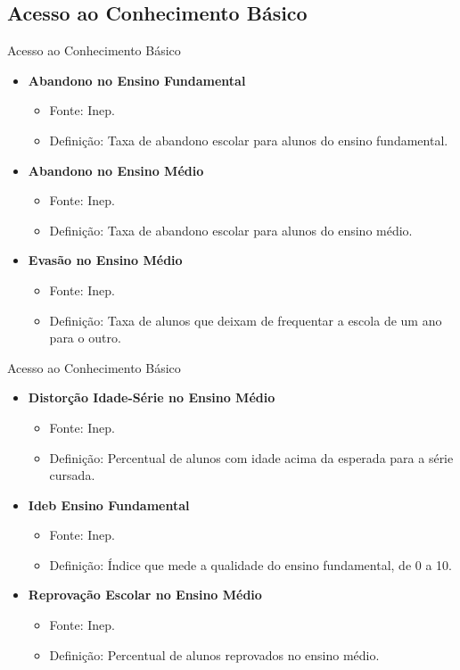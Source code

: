 \documentclass{beamer}
\begin{document}
\subsection{Acesso ao Conhecimento Básico}
\begin{frame}{Acesso ao Conhecimento Básico}
\begin{itemize}
    \item \textbf{Abandono no Ensino Fundamental}
    \begin{itemize}
        \item Fonte: Inep.
        \item Definição: Taxa de abandono escolar para alunos do ensino fundamental.
    \end{itemize}
    \item \textbf{Abandono no Ensino Médio}
    \begin{itemize}
        \item Fonte: Inep.
        \item Definição: Taxa de abandono escolar para alunos do ensino médio.
    \end{itemize}
    \item \textbf{Evasão no Ensino Médio}
    \begin{itemize}
        \item Fonte: Inep.
        \item Definição: Taxa de alunos que deixam de frequentar a escola de um ano para o outro.
    \end{itemize}
\end{itemize}
\end{frame}

\begin{frame}{Acesso ao Conhecimento Básico}
\begin{itemize}
    \item \textbf{Distorção Idade-Série no Ensino Médio}
    \begin{itemize}
        \item Fonte: Inep.
        \item Definição: Percentual de alunos com idade acima da esperada para a série cursada.
    \end{itemize}
    \item \textbf{Ideb Ensino Fundamental}
    \begin{itemize}
        \item Fonte: Inep.
        \item Definição: Índice que mede a qualidade do ensino fundamental, de 0 a 10.
    \end{itemize}
    \item \textbf{Reprovação Escolar no Ensino Médio}
    \begin{itemize}
        \item Fonte: Inep.
        \item Definição: Percentual de alunos reprovados no ensino médio.
    \end{itemize}
\end{itemize}
\end{frame}
\end{document}
